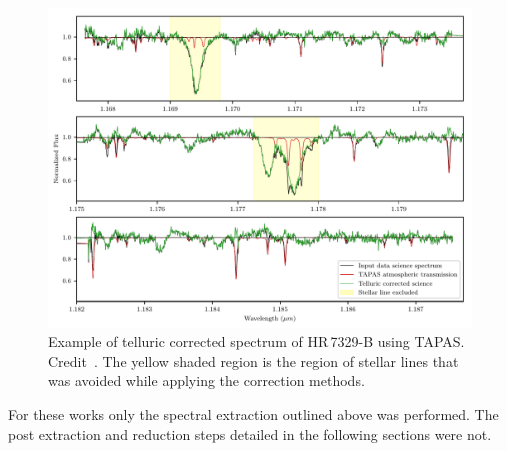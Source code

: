 \begin{figure}
    \centering
    \includegraphics[width=0.7\linewidth]{figures/reduction/ulmermol2018_tell_corr_CRIRES_48}
    \caption[Example of telluric corrected spectrum of {HR\,7329-B} using {TAPAS}.]{Example of telluric corrected spectrum of {HR\,7329-B} using {TAPAS}.
Credit~\citet[][]{ulmer-moll_telluric_2018}.
The yellow shaded region is the region of stellar lines that was avoided while applying the correction methods.}
    \label{fig:ulmermol2018tellcorrcrires48}
\end{figure}

For these works only the spectral extraction outlined above was performed.
The post extraction and reduction steps detailed in the following sections were not.




